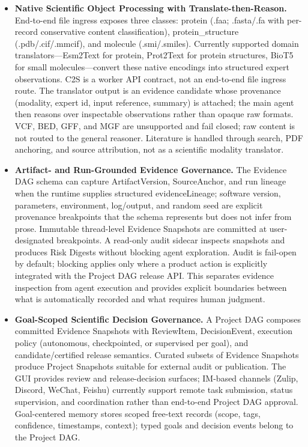 \documentclass[sn-basic,Numbered,pdflatex]{sn-jnl}
\begin{document}
\begin{itemize}
    \item \textbf{Native Scientific Object Processing with Translate-then-Reason.} End-to-end file ingress exposes three classes: protein (.faa; .fasta/.fa with per-record conservative content classification), protein\_structure (.pdb/.cif/.mmcif), and molecule (.smi/.smiles). Currently supported domain translators---Esm2Text for protein, Prot2Text for protein structures, BioT5 for small molecules---convert these native encodings into structured expert observations. C2S is a worker API contract, not an end-to-end file ingress route. The translator output is an evidence candidate whose provenance (modality, expert id, input reference, summary) is attached; the main agent then reasons over inspectable observations rather than opaque raw formats. VCF, BED, GFF, and MGF are unsupported and fail closed; raw content is not routed to the general reasoner. Literature is handled through search, PDF anchoring, and source attribution, not as a scientific modality translator.
    \item \textbf{Artifact- and Run-Grounded Evidence Governance.} The Evidence DAG schema can capture ArtifactVersion, SourceAnchor, and run lineage when the runtime supplies structured evidenceLineage; software version, parameters, environment, log/output, and random seed are explicit provenance breakpoints that the schema represents but does not infer from prose. Immutable thread-level Evidence Snapshots are committed at user-designated breakpoints. A read-only audit sidecar inspects snapshots and produces Risk Digests without blocking agent exploration. Audit is fail-open by default; blocking applies only where a product action is explicitly integrated with the Project DAG release API. This separates evidence inspection from agent execution and provides explicit boundaries between what is automatically recorded and what requires human judgment.
    \item \textbf{Goal-Scoped Scientific Decision Governance.} A Project DAG composes committed Evidence Snapshots with ReviewItem, DecisionEvent, execution policy (autonomous, checkpointed, or supervised per goal), and candidate/certified release semantics. Curated subsets of Evidence Snapshots produce Project Snapshots suitable for external audit or publication. The GUI provides review and release-decision surfaces; IM-based channels (Zulip, Discord, WeChat, Feishu) currently support remote task submission, status supervision, and coordination rather than end-to-end Project DAG approval. Goal-centered memory stores scoped free-text records (scope, tags, confidence, timestamps, context); typed goals and decision events belong to the Project DAG.
\end{itemize}
\end{document}
